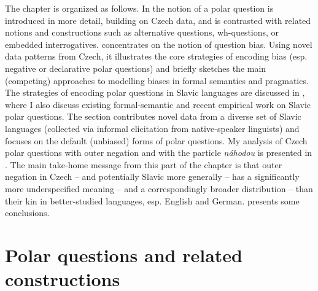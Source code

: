 \documentclass[output=paper,colorlinks,citecolor=brown]{langscibook}
\begin{document}
The chapter is organized as follows. In  the notion of a polar question is introduced in more detail, building on Czech data, and is contrasted with related notions and constructions such as alternative questions, wh-questions, or embedded interrogatives.  concentrates on the notion of question bias. Using novel data patterns from Czech, it illustrates the core strategies of encoding bias (esp. negative or declarative polar questions) and briefly sketches the main (competing) approaches to modelling biases in formal semantics and pragmatics. The strategies of encoding polar questions in Slavic languages are discussed in , where I also discuss existing formal-semantic and recent empirical work on Slavic polar questions. The section contributes novel data from a diverse set of Slavic languages (collected via informal elicitation from native-speaker linguists) and focuses on the default (unbiased) forms of polar questions. My analysis of Czech polar questions with outer negation and with the particle \textit{náhodou} is presented in . The main take-home message from this part of the chapter is that outer negation in Czech -- and potentially Slavic more generally -- has a significantly more underspecified meaning -- and a correspondingly broader distribution -- than their kin in better-studied languages, esp. English and German.  presents some conclusions.

\section{Polar questions and related constructions}\label{sim:sec:intro}
\end{document}

